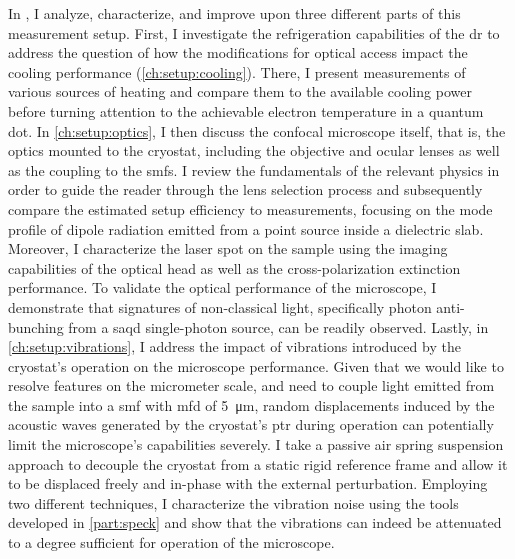 In \thispart, I analyze, characterize, and improve upon three different parts of this measurement setup.
First, I investigate the refrigeration capabilities of the \gls{dr} to address the question of how the modifications for optical access impact the cooling performance (\cref{ch:setup:cooling}).
There, I present measurements of various sources of heating and compare them to the available cooling power before turning attention to the achievable electron temperature in a \GaAsAlGaAs quantum dot.
In \cref{ch:setup:optics}, I then discuss the confocal microscope itself, that is, the optics mounted to the cryostat, including the objective and ocular lenses as well as the coupling to the \glspl{smf}.
I review the fundamentals of the relevant physics in order to guide the reader through the lens selection process and subsequently compare the estimated setup efficiency to measurements, focusing on the mode profile of dipole radiation emitted from a point source inside a dielectric slab.
Moreover, I characterize the laser spot on the sample using the imaging capabilities of the optical head as well as the cross-polarization extinction performance.
To validate the optical performance of the microscope, I demonstrate that signatures of non-classical light, specifically photon anti-bunching from a \gls{saqd} single-photon source, can be readily observed.
Lastly, in \cref{ch:setup:vibrations}, I address the impact of vibrations introduced by the cryostat's operation on the microscope performance.
Given that we would like to resolve features on the micrometer scale, and need to couple light emitted from the sample into a \gls{smf} with \gls{mfd} of \qty{5}{\micro\meter}, random displacements induced by the acoustic waves generated by the cryostat's \gls{ptr} during operation can potentially limit the microscope's capabilities severely.
I take a passive air spring suspension approach to decouple the cryostat from a static rigid reference frame and allow it to be displaced freely and in-phase with the external perturbation.
Employing two different techniques, I characterize the vibration noise using the tools developed in \cref{part:speck} and show that the vibrations can indeed be attenuated to a degree sufficient for operation of the microscope.
